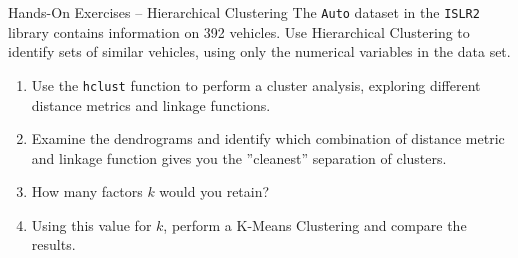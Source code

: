 \documentclass[ignorenonframetext,xcolor=x11names]{beamer}
\begin{document}
\begin{frame}{Hands-On Exercises -- Hierarchical Clustering}
The \texttt{Auto} dataset in the \texttt{ISLR2} library contains information on 392 vehicles. Use Hierarchical Clustering to identify sets of similar vehicles, using only the numerical variables in the data set.

\begin{enumerate}
   \item Use the \texttt{hclust} function to perform a cluster analysis, exploring different distance metrics and linkage functions.
   \item Examine the dendrograms and identify which combination of distance metric and linkage function gives you the ''cleanest'' separation of clusters.
   \item How many factors $k$ would you retain?
   \item Using this value for $k$, perform a K-Means Clustering and compare the results.
\end{enumerate}
\end{frame}
\end{document}
